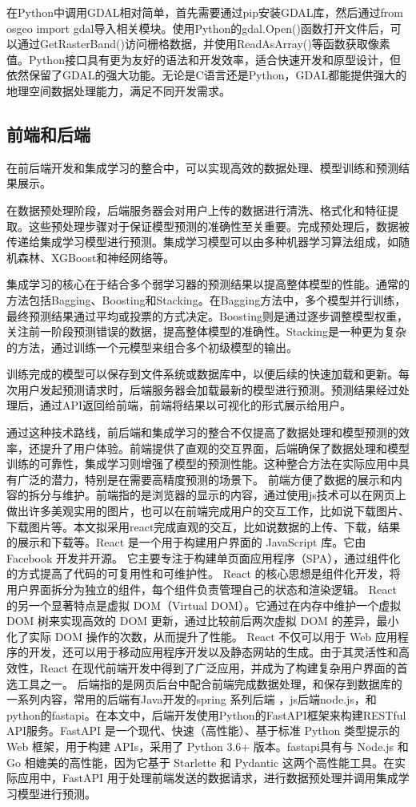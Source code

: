 \documentclass{article}
\begin{document}
	在Python中调用GDAL相对简单，首先需要通过pip安装GDAL库，然后通过from osgeo import gdal导入相关模块。使用Python的gdal.Open()函数打开文件后，可以通过GetRasterBand()访问栅格数据，并使用ReadAsArray()等函数获取像素值。Python接口具有更为友好的语法和开发效率，适合快速开发和原型设计，但依然保留了GDAL的强大功能。无论是C语言还是Python，GDAL都能提供强大的地理空间数据处理能力，满足不同开发需求。


	\subsection{前端和后端}
	在前后端开发和集成学习的整合中，可以实现高效的数据处理、模型训练和预测结果展示。
	
	在数据预处理阶段，后端服务器会对用户上传的数据进行清洗、格式化和特征提取。这些预处理步骤对于保证模型预测的准确性至关重要。完成预处理后，数据被传递给集成学习模型进行预测。集成学习模型可以由多种机器学习算法组成，如随机森林、XGBoost和神经网络等。
	
	集成学习的核心在于结合多个弱学习器的预测结果以提高整体模型的性能。通常的方法包括Bagging、Boosting和Stacking。在Bagging方法中，多个模型并行训练，最终预测结果通过平均或投票的方式决定。Boosting则是通过逐步调整模型权重，关注前一阶段预测错误的数据，提高整体模型的准确性。Stacking是一种更为复杂的方法，通过训练一个元模型来组合多个初级模型的输出。
	
	训练完成的模型可以保存到文件系统或数据库中，以便后续的快速加载和更新。每次用户发起预测请求时，后端服务器会加载最新的模型进行预测。预测结果经过处理后，通过API返回给前端，前端将结果以可视化的形式展示给用户。
	
	通过这种技术路线，前后端和集成学习的整合不仅提高了数据处理和模型预测的效率，还提升了用户体验。前端提供了直观的交互界面，后端确保了数据处理和模型训练的可靠性，集成学习则增强了模型的预测性能。这种整合方法在实际应用中具有广泛的潜力，特别是在需要高精度预测的场景下。
	前端方便了数据的展示和内容的拆分与维护。前端指的是浏览器的显示的内容，通过使用js技术可以在网页上做出许多美观实用的图片，也可以在前端完成用户的交互工作，比如说下载图片、下载图片等。本文拟采用react完成直观的交互，比如说数据的上传、下载，结果的展示和下载等。React 是一个用于构建用户界面的 JavaScript 库。它由 Facebook 开发并开源。
	它主要专注于构建单页面应用程序（SPA），通过组件化的方式提高了代码的可复用性和可维护性。 React 的核心思想是组件化开发，将用户界面拆分为独立的组件，每个组件负责管理自己的状态和渲染逻辑。 React 的另一个显著特点是虚拟 DOM（Virtual DOM）。它通过在内存中维护一个虚拟 DOM 树来实现高效的 DOM 更新，通过比较前后两次虚拟 DOM 的差异，最小化了实际 DOM 操作的次数，从而提升了性能。 React 不仅可以用于 Web 应用程序的开发，还可以用于移动应用程序开发以及静态网站的生成。由于其灵活性和高效性，React 在现代前端开发中得到了广泛应用，并成为了构建复杂用户界面的首选工具之一。
	后端指的是网页后台中配合前端完成数据处理，和保存到数据库的一系列内容，常用的后端有Java开发的spring 系列后端 ，js后端node.js，和python的fastapi。在本文中，后端开发使用Python的FastAPI框架来构建RESTful API服务。FastAPI 是一个现代、快速（高性能）、基于标准 Python 类型提示的 Web 框架，用于构建 APIs，采用了 Python 3.6+ 版本。fastapi具有与 Node.js 和 Go 相媲美的高性能，因为它基于 Starlette 和 Pydantic 这两个高性能工具。在实际应用中，FastAPI 用于处理前端发送的数据请求，进行数据预处理并调用集成学习模型进行预测。
	
\end{document}
